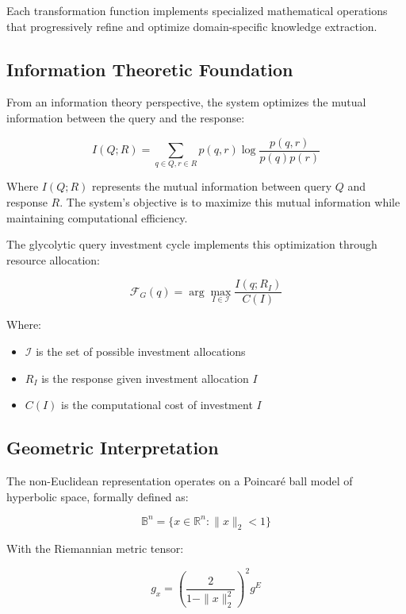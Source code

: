 \documentclass[journal,onecolumn]{IEEEtran}
\begin{document}
Each transformation function implements specialized mathematical operations that progressively refine and optimize domain-specific knowledge extraction.

\subsection{Information Theoretic Foundation}

From an information theory perspective, the system optimizes the mutual information between the query and the response:

\begin{equation}
I(Q; R) = \sum_{q \in Q, r \in R} p(q, r) \log \frac{p(q, r)}{p(q)p(r)}
\end{equation}

Where $I(Q; R)$ represents the mutual information between query $Q$ and response $R$. The system's objective is to maximize this mutual information while maintaining computational efficiency.

The glycolytic query investment cycle implements this optimization through resource allocation:

\begin{equation}
\mathcal{F}_G(q) = \arg\max_{I \in \mathcal{I}} \frac{I(q; R_I)}{C(I)}
\end{equation}

Where:
\begin{itemize}
\item $\mathcal{I}$ is the set of possible investment allocations
\item $R_I$ is the response given investment allocation $I$
\item $C(I)$ is the computational cost of investment $I$
\end{itemize}

\subsection{Geometric Interpretation}

The non-Euclidean representation operates on a Poincaré ball model of hyperbolic space, formally defined as:

\begin{equation}
\mathbb{B}^n = \{x \in \mathbb{R}^n : \|x\|_2 < 1\}
\end{equation}

With the Riemannian metric tensor:

\begin{equation}
g_x = \left(\frac{2}{1 - \|x\|_2^2}\right)^2 g^E
\end{equation}
\end{document}
